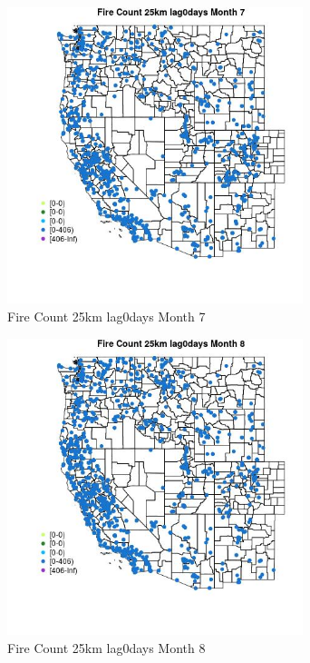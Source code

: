 \begin{figure} 
\centering  
\includegraphics[width=0.77\textwidth]{Code_Outputs/Report_ML_input_PM25_Step4_part_f_de_duplicated_aveswNAs_MapObsMo7Fire_Count_25km_lag0days.jpg} 
\caption{\label{fig:Report_ML_input_PM25_Step4_part_f_de_duplicated_aveswNAsMapObsMo7Fire_Count_25km_lag0days}Fire Count 25km lag0days Month 7} 
\end{figure} 
 

\clearpage 

\begin{figure} 
\centering  
\includegraphics[width=0.77\textwidth]{Code_Outputs/Report_ML_input_PM25_Step4_part_f_de_duplicated_aveswNAs_MapObsMo8Fire_Count_25km_lag0days.jpg} 
\caption{\label{fig:Report_ML_input_PM25_Step4_part_f_de_duplicated_aveswNAsMapObsMo8Fire_Count_25km_lag0days}Fire Count 25km lag0days Month 8} 
\end{figure} 
 

